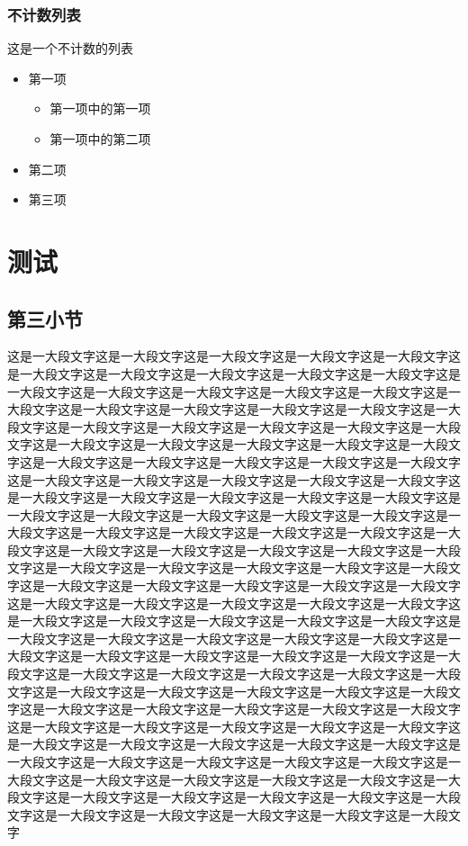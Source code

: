 \documentclass[]{WHUBachelor}
\begin{document}
  \subsection{不计数列表}
	这是一个不计数的列表
	\begin{itemize}
		\item 第一项
		\begin{itemize}
			\item 第一项中的第一项
			\item 第一项中的第二项
		\end{itemize}
		\item 第二项
		\item 第三项
	\end{itemize}

  \chapter{测试}
  \section{第三小节}
	这是一大段文字这是一大段文字这是一大段文字这是一大段文字这是一大段文字这是一大段文字这是一大段文字这是一大段文字这是一大段文字这是一大段文字这是一大段文字这是一大段文字这是一大段文字这是一大段文字这是一大段文字这是一大段文字这是一大段文字这是一大段文字这是一大段文字这是一大段文字这是一大段文字这是一大段文字这是一大段文字这是一大段文字这是一大段文字这是一大段文字这是一大段文字这是一大段文字这是一大段文字这是一大段文字这是一大段文字这是一大段文字这是一大段文字这是一大段文字这是一大段文字这是一大段文字这是一大段文字这是一大段文字这是一大段文字这是一大段文字这是一大段文字这是一大段文字这是一大段文字这是一大段文字这是一大段文字这是一大段文字这是一大段文字这是一大段文字这是一大段文字这是一大段文字这是一大段文字这是一大段文字这是一大段文字这是一大段文字这是一大段文字这是一大段文字这是一大段文字这是一大段文字这是一大段文字这是一大段文字这是一大段文字这是一大段文字这是一大段文字这是一大段文字这是一大段文字这是一大段文字这是一大段文字这是一大段文字这是一大段文字这是一大段文字这是一大段文字这是一大段文字这是一大段文字这是一大段文字这是一大段文字这是一大段文字这是一大段文字这是一大段文字这是一大段文字这是一大段文字这是一大段文字这是一大段文字这是一大段文字这是一大段文字这是一大段文字这是一大段文字这是一大段文字这是一大段文字这是一大段文字这是一大段文字这是一大段文字这是一大段文字这是一大段文字这是一大段文字这是一大段文字这是一大段文字这是一大段文字这是一大段文字这是一大段文字这是一大段文字这是一大段文字这是一大段文字这是一大段文字这是一大段文字这是一大段文字这是一大段文字这是一大段文字这是一大段文字这是一大段文字这是一大段文字这是一大段文字这是一大段文字这是一大段文字这是一大段文字这是一大段文字这是一大段文字这是一大段文字这是一大段文字这是一大段文字这是一大段文字这是一大段文字这是一大段文字这是一大段文字这是一大段文字这是一大段文字这是一大段文字这是一大段文字这是一大段文字这是一大段文字这是一大段文字这是一大段文字这是一大段文字这是一大段文字这是一大段文字这是一大段文字这是一大段文字这是一大段文字这是一大段文字这是一大段文字
\end{document}
